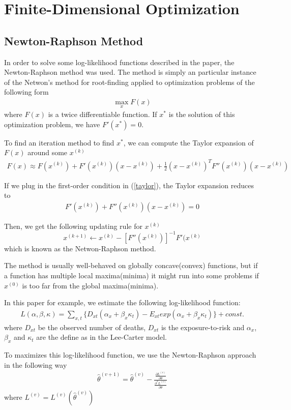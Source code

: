 \documentclass[]{article}
\begin{document}
\section{Finite-Dimensional Optimization}
\subsection{Newton-Raphson Method}

In order to solve some log-likelihood functions described in the paper, the Newton-Raphson method was used. The method is simply an particular instance of the Netwon's method for root-finding applied to optimization problems of the following form
\begin{align}
	\max_x F(x)
\end{align}
where $F(x)$ is a twice differentiable function. If $x^*$ is the solution of this optimization problem, we have $F'(x^*)=0$.

To find an iteration method to find $x^*$, we can compute the Taylor expansion of $F(x)$ around some $x^{(k)}$
\begin{align}\label{taylor}
F(x) \approx F(x^{(k)}) + F'(x^{(k)}) (x-x^{(k)}) + \frac{1}{2} (x-x^{(k)})^T F''(x^{(k)}) (x-x^{(k)})
\end{align}

If we plug in the first-order condition in (\ref{taylor}), the Taylor expansion reduces to
\begin{align}
F'(x^{(k)})+F''(x^{(k)}) (x-x^{(k)}) = 0 
\end{align}

Then, we get the following updating rule for $x^{(k)}$
$$x^{(k+1)} \leftarrow x^{(k)} - [F''(x^{(k)})]^{-1}F'(x^{(k)}$$
which is known as the Netwon-Raphson method.

The method is usually well-behaved on globally concave(convex) functions, but if a function has multiple local maxima(minima) it might run into some problems if $x^{(0)}$ is too far from the global maxima(minima).

In this paper for example, we estimate the following log-likelihood function:
\begin{align}
L(\alpha,\beta,\kappa)=\sum_{x,t}\{D_{xt}(\alpha_x+\beta_x\kappa_t)-E_{xt}exp(\alpha_x+\beta_x\kappa_t)\}+const.
\end{align}
where $D_{xt}$ be the observed number of deaths, $D_{xt}$ is the exposure-to-risk and $\alpha_x$, $\beta_x$ and $\kappa_t$ are the define as in the Lee-Carter model.

To maximizes this log-likelihood function, we use the Newton-Raphson approach in the following way
\begin{align}
\hat{\theta}^{(v+1)}=\hat{\theta}^{(v)}  - \frac{\frac{\partial L^{(v)}}{\partial \theta}}
{\frac{\partial^2 L^{(v)}}{\partial \theta}}
\end{align}
where $L^{(v)} = L^{(v)}(\hat{\theta}^{(v)})$
\end{document}
